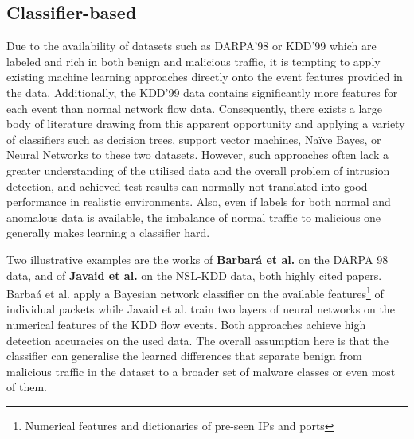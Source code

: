 \documentclass[a4paper,12pt,twoside]{report}
\begin{document}
\subsection{Classifier-based}

Due to the availability of datasets such as DARPA'98 or KDD'99 which are labeled and rich in both benign and malicious traffic, it is tempting to apply existing machine learning approaches directly onto the event features provided in the data. Additionally, the KDD'99 data contains significantly more features for each event than normal network flow data. Consequently, there exists a large body of literature drawing from this apparent opportunity and applying a variety of classifiers such as  decision trees, support vector machines, Na\"ive Bayes, or Neural Networks to these two datasets. However, such approaches often lack a greater understanding of the utilised data and the overall problem of intrusion detection, and achieved test results can normally not translated into good performance in realistic environments. Also, even if labels for both normal and anomalous data is available, the imbalance of normal traffic to malicious one generally makes learning a classifier hard.

Two illustrative examples are the works of \textbf{Barbar\'a et al.} \cite{barbara2001detecting} on the DARPA 98 data, and of \textbf{Javaid et al.} \cite{javaid2016deep} on the NSL-KDD data, both highly cited papers. Barba\'a et al. apply a Bayesian network classifier on the available features\footnote{Numerical features and dictionaries of pre-seen IPs and ports} of individual packets while Javaid et al. train two layers of neural networks on the numerical features of the KDD flow events. Both approaches achieve high detection accuracies on the used data. The overall assumption here is that the classifier can generalise the learned differences that separate benign from malicious traffic in the dataset to a broader set of malware classes or even most of them. 
\end{document}
